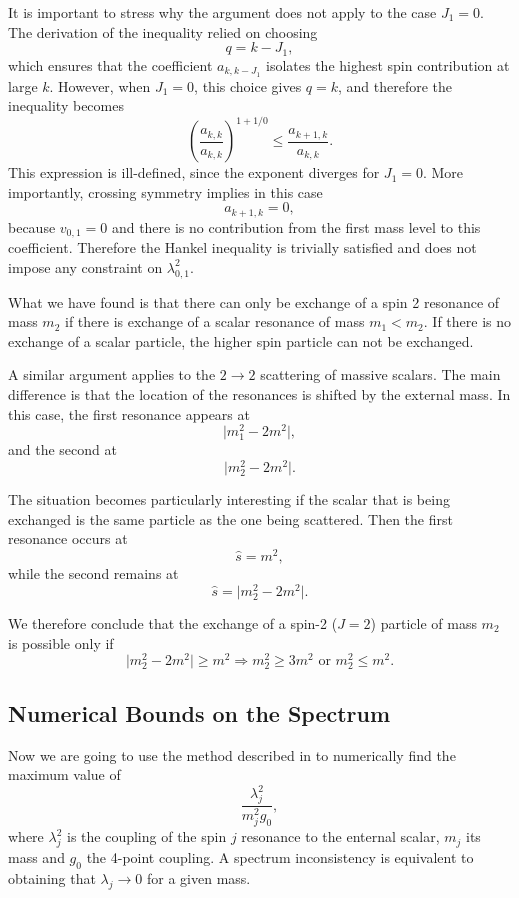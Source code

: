 It is important to stress why the argument does not apply to the case $J_1 = 0$. 
The derivation of the inequality relied on choosing 
\begin{equation}
    q = k - J_1,
\end{equation}
which ensures that the coefficient $a_{k,k-J_1}$ isolates the highest spin contribution at large $k$. 
However, when $J_1 = 0$, this choice gives $q = k$, and therefore the inequality becomes
\begin{equation}
    \left( \frac{a_{k,k}}{a_{k,k}} \right)^{1 + 1/0}
    \leq
    \frac{a_{k+1,k}}{a_{k,k}}.
\end{equation}
This expression is ill-defined, since the exponent diverges for $J_1 = 0$. 
More importantly, crossing symmetry implies in this case
\begin{equation}
    a_{k+1,k} = 0,
\end{equation}
because $v_{0,1}=0$ and there is no contribution from the first mass level to this coefficient. 
Therefore the Hankel inequality is trivially satisfied and does not impose any constraint on $\lambda_{0,1}^2$.

What we have found is that there can only be exchange of a spin 2 resonance of mass $m_2$ if there is exchange of a scalar resonance of mass $m_1 < m_2$. If there is no exchange of a scalar particle, the higher spin particle can not be exchanged.

A similar argument applies to the $2 \to 2$ scattering of massive scalars. 
The main difference is that the location of the resonances is shifted by the external mass. 
In this case, the first resonance appears at 
\[
\lvert m_1^2 - 2m^2 \rvert,
\]
and the second at 
\[
\lvert m_2^2 - 2m^2 \rvert.
\]

The situation becomes particularly interesting if the scalar that is being exchanged is the same particle as the one being scattered. 
Then the first resonance occurs at
\[
\hat{s} = m^2,
\]
while the second remains at
\[
\hat{s} = \lvert m_2^2 - 2m^2 \rvert.
\]

We therefore conclude that the exchange of a spin-2 ($J=2$) particle of mass $m_2$ is possible only if
\[
\lvert m_2^2 - 2m^2 \rvert \geq m^2 \Rightarrow m_2^2 \geq 3m^2 \text{ or } m_2^2 \leq m^2.
\]


\subsection{Numerical Bounds on the Spectrum}
Now we are going to use the method described in  to numerically find the maximum value of 
$$
\frac{\lambda_j^2}{m_j^2 g_0},
$$
where $\lambda_j^2$ is the coupling of the spin $j$ resonance to the enternal scalar, $m_j$ its mass and $g_0$ the 4-point coupling. A spectrum inconsistency is equivalent to obtaining that $\lambda_j \to 0$ for a given mass.

